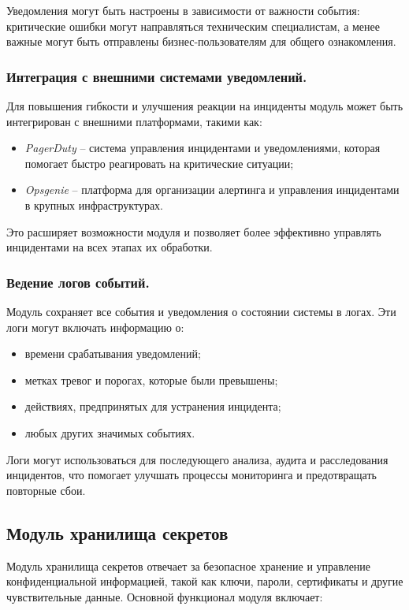 Уведомления могут быть настроены в зависимости от важности события: критические ошибки могут направляться техническим специалистам, а менее важные могут быть отправлены бизнес-пользователям для общего ознакомления.

\subsubsection{Интеграция с внешними системами уведомлений.} Для повышения гибкости и улучшения реакции на инциденты модуль может быть интегрирован с внешними платформами, такими как:
\begin{itemize}
    \item \textit{PagerDuty} -- система управления инцидентами и уведомлениями, которая помогает быстро реагировать на критические ситуации;
    \item \textit{Opsgenie} -- платформа для организации алертинга и управления инцидентами в крупных инфраструктурах.
\end{itemize}

Это расширяет возможности модуля и позволяет более эффективно управлять инцидентами на всех этапах их обработки.

\subsubsection{Ведение логов событий.} Модуль сохраняет все события и уведомления о состоянии системы в логах. Эти логи могут включать информацию о:
\begin{itemize}
    \item времени срабатывания уведомлений;
    \item метках тревог и порогах, которые были превышены;
    \item действиях, предпринятых для устранения инцидента;
    \item любых других значимых событиях.
\end{itemize}

Логи могут использоваться для последующего анализа, аудита и расследования инцидентов, что помогает улучшать процессы мониторинга и предотвращать повторные сбои.

\subsection{Модуль хранилища секретов}
\label{sec:secrets_storage_functionality}

Модуль хранилища секретов отвечает за безопасное хранение и управление конфиденциальной информацией, такой как ключи, пароли, сертификаты и другие чувствительные данные. Основной функционал модуля включает:

